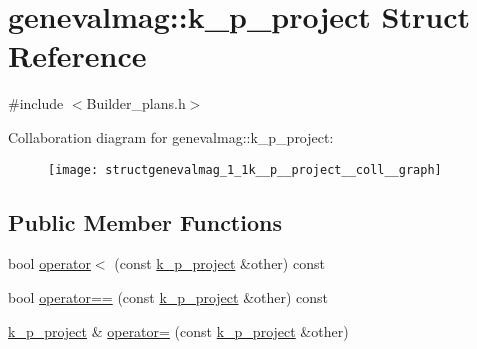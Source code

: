 \hypertarget{structgenevalmag_1_1k__p__project}{
\section{genevalmag::k\_\-p\_\-project Struct Reference}
\label{structgenevalmag_1_1k__p__project}
}


{\ttfamily \#include $<$Builder\_\-plans.h$>$}



Collaboration diagram for genevalmag::k\_\-p\_\-project:\nopagebreak
\begin{figure}[H]
\begin{center}
\leavevmode
\texttt{[image: structgenevalmag\_1\_1k\_\_p\_\_project\_\_coll\_\_graph]}
\end{center}
\end{figure}
\subsection*{Public Member Functions}
\begin{DoxyCompactItemize}
\item 
bool \hyperlink{structgenevalmag_1_1k__p__project_a4a06d269aa9b57fb5579757fad027c3f}{operator$<$} (const \hyperlink{structgenevalmag_1_1k__p__project}{k\_\-p\_\-project} \&other) const 
\item 
bool \hyperlink{structgenevalmag_1_1k__p__project_a277ca3092cf5e354a88ee0d63ac4bc25}{operator==} (const \hyperlink{structgenevalmag_1_1k__p__project}{k\_\-p\_\-project} \&other) const 
\item 
\hyperlink{structgenevalmag_1_1k__p__project}{k\_\-p\_\-project} \& \hyperlink{structgenevalmag_1_1k__p__project_ae64d4643b5a6e52389a540b5725dc148}{operator=} (const \hyperlink{structgenevalmag_1_1k__p__project}{k\_\-p\_\-project} \&other)
\end{DoxyCompactItemize}
